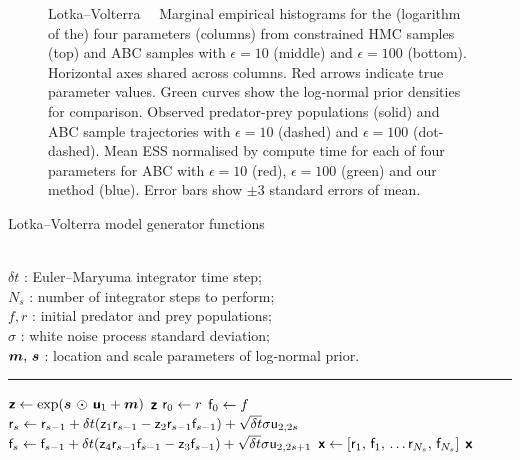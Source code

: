 \begin{figure}[!t]
\begin{subfigure}[b]{0.52\textwidth}
  \caption{}
  \label{sfig:lotka-volterra-ess}
\end{subfigure}
\caption[Inference in Lotka--Volterra simulator model.]{\textsf{Lotka--Volterra}~~ 
 Marginal empirical histograms for the (logarithm of the) four parameters (columns) from constrained \ac{HMC} samples (top) and \ac{ABC} samples with $\epsilon=10$ (middle) and $\epsilon=100$ (bottom). Horizontal axes shared across columns. Red arrows indicate true parameter values.  Green curves show the log-normal prior densities for comparison. 
 Observed predator-prey populations (solid) and \ac{ABC} sample trajectories with $\epsilon=10$ (dashed) and $\epsilon=100$ (dot-dashed). 
 Mean \ac{ESS} normalised by compute time for each of four parameters for \ac{ABC} with $\epsilon=10$ (red), $\epsilon=100$ (green) and our method (blue). Error bars show $\pm 3$ standard errors of mean.}
\label{fig:lotka-volterra}
\end{figure}

\begin{algorithm}[t]
\caption{Lotka--Volterra model generator functions}
\label{alg:lotka-volterra-generators}
\begin{algorithmic}
\small
    \Require\\
    $\delta t$ : Euler--Maryuma integrator time step;\\
    $N_s$ : number of integrator steps to perform;\\
    $f, r$ : initial predator and prey populations; \\
    $\sigma$ : white noise process standard deviation; \\
    $\boldsymbol{m},\,\boldsymbol{s}$ : location and scale parameters of log-normal prior.\\
\end{algorithmic}
\vspace{-1mm}
\hrule
\vspace{1mm}
\small
\begin{algorithmic}
  \State $\boldsymbol{\mathsf{z}} \gets \exp(\boldsymbol{s} \,\odot\, \boldsymbol{\mathsf{u}}_1 + \boldsymbol{m})$
  \State \Return $\boldsymbol{\mathsf{z}}$
\EndFunction
{}
  \State $\mathsf{r}_0 \gets r$  
  \State $\mathsf{f}_0 \gets f$
    \State $\mathsf{r}_s \gets \mathsf{r}_{s-1} + \delta t(\mathsf{z}_1 \mathsf{r}_{s-1} - \mathsf{z}_2 \mathsf{r}_{s-1} \mathsf{f}_{s-1}) + \sqrt{\delta t} \sigma  \mathsf{u}_{2,2s}$
    \State $\mathsf{f}_s \gets \mathsf{f}_{s-1} + \delta t(\mathsf{z}_4 \mathsf{r}_{s-1} \mathsf{f}_{s-1} - \mathsf{z}_3 \mathsf{f}_{s-1}) + \sqrt{\delta t} \sigma  \mathsf{u}_{2,2s+1}$
  \EndFor
  \State $\rvct{x} \gets \lsb \rvar{r}_1,\, \rvar{f}_1, \,\dots \rvar{r}_{N_s},\,\rvar{f}_{N_s} \rsb$
  \State \Return $\boldsymbol{\mathsf{x}}$
\EndFunction
\end{algorithmic}
\end{algorithm}

